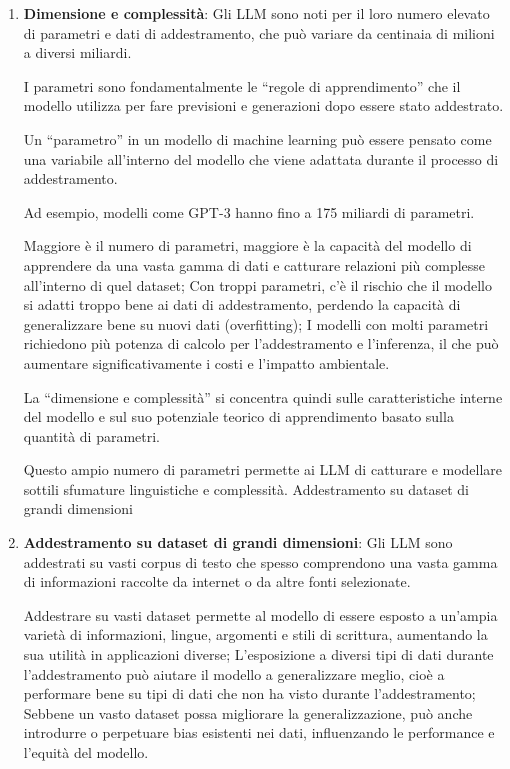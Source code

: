             \begin{enumerate}
                \item
                    \textbf{Dimensione e complessità}: Gli LLM sono noti per il loro numero elevato di parametri e dati di addestramento, che può variare da centinaia di milioni a diversi miliardi.
            
                    I parametri sono fondamentalmente le ``regole di apprendimento'' che il modello utilizza per fare previsioni e generazioni dopo essere stato addestrato.
                    
                    Un ``parametro'' in un modello di machine learning può essere pensato come una variabile all'interno del modello che viene adattata durante il processo di addestramento.
                    
                    Ad esempio, modelli come GPT-3 hanno fino a 175 miliardi di parametri.
                    
                    Maggiore è il numero di parametri, maggiore è la capacità del modello di apprendere da una vasta gamma di dati e catturare relazioni più complesse all'interno di quel dataset; Con troppi parametri, c'è il rischio che il modello si adatti troppo bene ai dati di addestramento, perdendo la capacità di generalizzare bene su nuovi dati (overfitting); I modelli con molti parametri richiedono più potenza di calcolo per l'addestramento e l'inferenza, il che può aumentare significativamente i costi e l'impatto ambientale.
                    
                    La ``dimensione e complessità'' si concentra quindi sulle caratteristiche interne del modello e sul suo potenziale teorico di apprendimento basato sulla quantità di parametri.
                    
                    Questo ampio numero di parametri permette ai LLM di catturare e modellare sottili sfumature linguistiche e complessità. Addestramento su dataset di grandi dimensioni
                
                \item
                    \textbf{Addestramento su dataset di grandi dimensioni}: Gli LLM sono addestrati su vasti corpus di testo che spesso comprendono una vasta gamma di informazioni raccolte da internet o da altre fonti selezionate.
            
                    Addestrare su vasti dataset permette al modello di essere esposto a un'ampia varietà di informazioni, lingue, argomenti e stili di scrittura, aumentando la sua utilità in applicazioni diverse; L'esposizione a diversi tipi di dati durante l'addestramento può aiutare il modello a generalizzare meglio, cioè a performare bene su tipi di dati che non ha visto durante l'addestramento; Sebbene un vasto dataset possa migliorare la generalizzazione, può anche introdurre o perpetuare bias esistenti nei dati, influenzando le performance e l'equità del modello.
                    

\end{enumerate}
